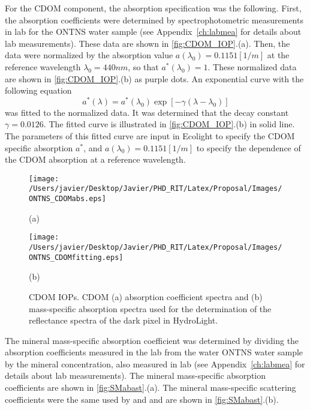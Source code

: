For the CDOM component, the absorption specification was the following. First, the absorption coefficients were determined by spectrophotometric measurements in lab for the ONTNS water sample (see Appendix~\ref{ch:labmea} for details about lab measurements). These data are shown in \autoref{fig:CDOM_IOP}.(a). Then, the data were normalized by the absorption value $a(\lambda_0)=0.1151[1/m]$ at the reference wavelength $\lambda_0=440nm$, so that $a^*(\lambda_0)=1$. These normalized data are shown in \autoref{fig:CDOM_IOP}.(b) as purple dots. An exponential curve with the following equation
\begin{equation}
	\label{eq:CDOMabs}
	a^*(\lambda)=a^*(\lambda_0)\exp{\left[-\gamma(\lambda-\lambda_0)\right]}
\end{equation}
was fitted to the normalized data. It was determined that the decay constant $\gamma=0.0126$. The fitted curve is illustrated in \autoref{fig:CDOM_IOP}.(b) in solid line. The parameters of this fitted curve are input in Ecolight to specify the CDOM specific absorption $a^*$, and $a(\lambda_0)=0.1151[1/m]$ to specify the dependence of the CDOM absorption at a reference wavelength.

\begin{figure}[!ht]
  \begin{minipage}[c]{0.48\linewidth}
  	\centering
  	\texttt{[image: /Users/javier/Desktop/Javier/PHD\_RIT/Latex/Proposal/Images/ONTNS\_CDOMabs.eps]}
    \centerline{(a)}\medskip
  \end{minipage} 
  \hfill 
  \begin{minipage}[c]{0.48\linewidth}
  	\centering
  	\texttt{[image: /Users/javier/Desktop/Javier/PHD\_RIT/Latex/Proposal/Images/ONTNS\_CDOMfitting.eps]}
    \centerline{(b)}\medskip
  \end{minipage}    
  \caption{CDOM IOPs. CDOM (a) absorption coefficient spectra and (b) mass-specific absorption spectra used for the determination of the reflectance spectra of the dark pixel in HydroLight. \label{fig:CDOM_IOP} } 
\end{figure}

The mineral mass-specific absorption coefficient was determined by dividing the absorption coefficients measured in the lab from the water ONTNS water sample by the mineral concentration, also measured in lab (see Appendix~\ref{ch:labmea} for details about lab measurements). The mineral mass-specific absorption coefficients are shown in \autoref{fig:SMabast}.(a). The mineral mass-specific scattering coefficients were the same used by \cite{Raqueno:2000} and \cite{Raqueno:2003} and are shown in \autoref{fig:SMabast}.(b).


